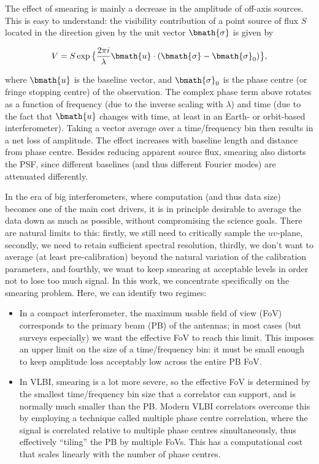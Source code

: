 \documentclass[useAMS,usenatbib]{mn2e}
\begin{document}
The effect of smearing is mainly a decrease in the amplitude of off-axis sources. This is easy to understand: the visibility contribution of a point source of flux $S$ located in the direction given by the unit vector $\bmath{\sigma}$ is given by

\begin{equation}
V = S \exp \big \{  \frac{2\pi i}{\lambda} \bmath{u}\cdot(\bmath{\sigma}-\bmath{\sigma}_0) \big \},
\end{equation}

where $\bmath{u}$ is the baseline vector, and $\bmath{\sigma}_0$ is the phase centre (or fringe stopping centre) of the observation.
The complex phase term above rotates as a function of frequency (due to the inverse scaling with $\lambda$) and time (due to
the fact that $\bmath{u}$ changes with time, at least in an Earth- or orbit-based interferometer). 
Taking a vector average over a time/frequency bin then results  in a net loss of amplitude. The effect increases 
with baseline length and distance from phase centre. Besides reducing apparent source flux, smearing also distorts the PSF, since different baselines (and thus different Fourier modes) are attenuated differently.

In the era of big interferometers, where computation (and thus data size) becomes one of the main cost drivers, it is 
in principle desirable to average the data down as much as possible, without compromising the science goals. There are natural limits to this: firstly, we still need to critically sample the $uv$-plane, secondly, we need to retain sufficient spectral resolution, thirdly, we don't want to average (at least pre-calibration) beyond the natural variation of the calibration parameters, and fourthly, we want to keep smearing at acceptable levels in order not to lose too much signal. In this work, we concentrate specifically on the smearing problem. Here, we can identify two regimes:

\begin{itemize}
\item In a compact interferometer, the maximum usable field of view (FoV) corresponds to the primary beam (PB) of the antennas; in
most cases (but surveys especially) we want the effective FoV to reach this limit. This imposes an upper limit on the size of a 
time/frequency bin: it must be small enough to keep amplitude loss acceptably low across the entire PB FoV. 
\item In VLBI, smearing is a lot more severe, so the effective FoV is determined by the smallest time/frequency bin size that a
correlator can support, and is normally much smaller than the PB. Modern VLBI correlators overcome this by employing a technique 
called multiple phase centre correlation, where the signal is correlated relative to multiple phase centres simultaneously, thus
effectively ``tiling'' the PB by multiple FoVs. This has a computational cost that scales linearly with the number of phase centres.
\end{itemize}
\end{document}
